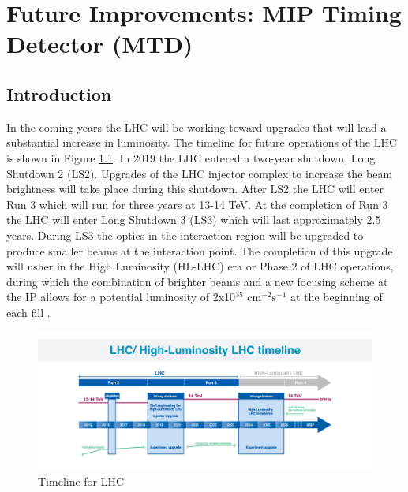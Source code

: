 \chapter{Future Improvements: MIP Timing Detector (MTD)}
\section{Introduction}

In the coming years the LHC will be working toward upgrades that will lead a substantial increase in luminosity.  The timeline for future operations of the LHC is shown in Figure \ref{fig:lhctimeline}.  In 2019 the LHC entered a two-year shutdown, Long Shutdown 2 (LS2).  Upgrades of the LHC injector complex to increase the beam brightness will take place during this shutdown.  After LS2 the LHC will enter Run 3 which will run for three years at 13-14 TeV.  At the completion of Run 3 the LHC will enter Long Shutdown 3 (LS3) which will last approximately 2.5 years.  During LS3 the optics in the interaction region will be upgraded to produce smaller beams at the interaction point.  The completion of this upgrade will usher in the High Luminosity (HL-LHC) era or Phase 2 of LHC operations, during which the combination of brighter beams and a new focusing scheme at the IP allows for a potential luminosity of 2x10$^{35}$ cm$^{-2}$s$^{-1}$ at the beginning of each fill \cite{Apollinari:2017cqg}.  

\begin{figure}[h]
	\centering
	\includegraphics[width=1.0\linewidth]{Figures/LHCTimeline}
	\caption[Timeline for LHC]{Timeline for LHC \cite{DeMelis:2063307}}
	\label{fig:lhctimeline}
\end{figure}

